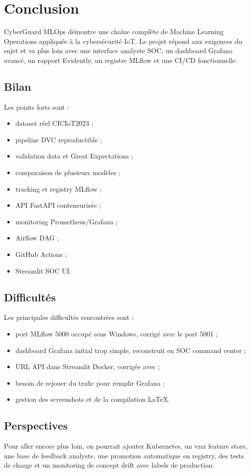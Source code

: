 \chapter{Conclusion}

CyberGuard MLOps démontre une chaîne complète de Machine Learning Operations appliquée à la cybersécurité IoT. Le projet répond aux exigences du sujet et va plus loin avec une interface analyste SOC, un dashboard Grafana avancé, un rapport Evidently, un registre MLflow et une CI/CD fonctionnelle.

\section{Bilan}
Les points forts sont :
\begin{itemize}
  \item dataset réel CICIoT2023 ;
  \item pipeline DVC reproductible ;
  \item validation data et Great Expectations ;
  \item comparaison de plusieurs modèles ;
  \item tracking et registry MLflow ;
  \item API FastAPI conteneurisée ;
  \item monitoring Prometheus/Grafana ;
  \item Airflow DAG ;
  \item GitHub Actions ;
  \item Streamlit SOC UI.
\end{itemize}

\section{Difficultés}
Les principales difficultés rencontrées sont :
\begin{itemize}
  \item port MLflow 5000 occupé sous Windows, corrigé avec le port 5001 ;
  \item dashboard Grafana initial trop simple, reconstruit en SOC command center ;
  \item URL API dans Streamlit Docker, corrigée avec  ;
  \item besoin de rejouer du trafic pour remplir Grafana ;
  \item gestion des screenshots et de la compilation LaTeX.
\end{itemize}

\section{Perspectives}
Pour aller encore plus loin, on pourrait ajouter Kubernetes, un vrai feature store, une base de feedback analyste, une promotion automatique en registry, des tests de charge et un monitoring de concept drift avec labels de production.
